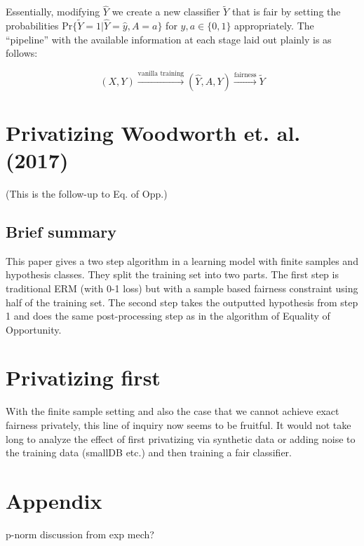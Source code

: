 \documentclass[runningheads]{article}
\newcommand{\1}{\mathbbm{1}}
\theoremstyle{definition}
\begin{document}
Essentially, modifying $\hat{Y}$ we create a new classifier $\tilde{Y}$ that is fair by setting the probabilities $\text{Pr}\{\tilde{Y} = 1 | \hat{Y} = \hat{y}, A = a \}$ for $\hat{y}, a \in \{0,1\}$ appropriately. The ``pipeline'' with the available information at each stage laid out plainly is as follows:

$$(X,Y) \xrightarrow[]{\text{vanilla training}} (\hat{Y},A,Y) \xrightarrow[]{\text{fairness}} \tilde{Y} $$


\section{Privatizing Woodworth et. al. (2017)}
(This is the follow-up to Eq. of Opp.)

\subsection{Brief summary}
This paper gives a two step algorithm in a learning model with finite samples and hypothesis classes. They split the training set into two parts. The first step is traditional ERM (with 0-1 loss) but with a sample based fairness constraint using half of the training set. The second step takes the outputted hypothesis from step 1 and does the same post-processing step as in the algorithm of Equality of Opportunity.


\section{Privatizing first}
With the finite sample setting and also the case that we cannot achieve exact fairness privately, this line of inquiry now seems to be fruitful. It would not take long to analyze the effect of first privatizing via synthetic data or adding noise to the training data (smallDB etc.) and then training a fair classifier.

\section{Appendix}
p-norm discussion from exp mech?
\end{document}
